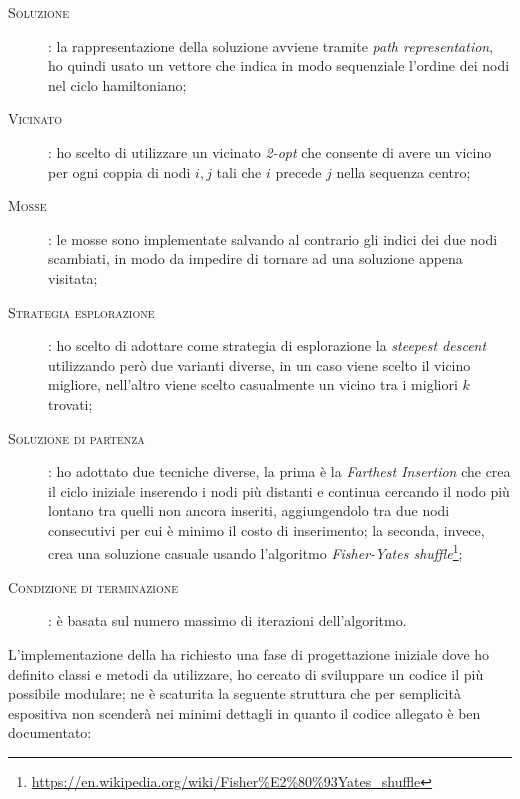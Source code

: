 \begin{description}
\item[\textsc{Soluzione}]: la rappresentazione della soluzione avviene tramite \emph{path representation}, ho quindi usato un vettore che indica in modo sequenziale l'ordine dei nodi nel ciclo hamiltoniano;
\item[\textsc{Vicinato}]: ho scelto di utilizzare un vicinato \emph{2-opt} che consente di avere un vicino per ogni coppia di nodi $i, j$ tali che $i$ precede $j$ nella sequenza centro;
\item[\textsc{Mosse}]: le mosse sono implementate salvando al contrario gli indici dei due nodi scambiati, in modo da impedire di tornare ad una soluzione appena visitata;
\item[\textsc{Strategia esplorazione}]: ho scelto di adottare come strategia di esplorazione la \emph{steepest descent} utilizzando però due varianti diverse, in un caso viene scelto il vicino migliore, nell'altro viene scelto casualmente un vicino tra i migliori $k$ trovati;
\item[\textsc{Soluzione di partenza}]: ho adottato due tecniche diverse, la prima è la \emph{Farthest Insertion} che crea il ciclo iniziale inserendo i nodi più distanti e continua cercando il nodo più lontano tra quelli non ancora inseriti, aggiungendolo tra due nodi consecutivi per cui è minimo il costo di inserimento; la seconda, invece, crea una soluzione casuale usando l'algoritmo \emph{Fisher-Yates shuffle}\footnote{\url{https://en.wikipedia.org/wiki/Fisher\%E2\%80\%93Yates_shuffle}};
\item[\textsc{Condizione di terminazione}]: è basata sul numero massimo di iterazioni dell'algoritmo.
\end{description}

L'implementazione della \tabu ha richiesto una fase di progettazione iniziale dove ho definito classi e metodi da utilizzare, ho cercato di sviluppare un codice il più possibile modulare; ne è scaturita la seguente struttura che per semplicità espositiva non scenderà nei minimi dettagli in quanto il codice allegato è ben documentato:

